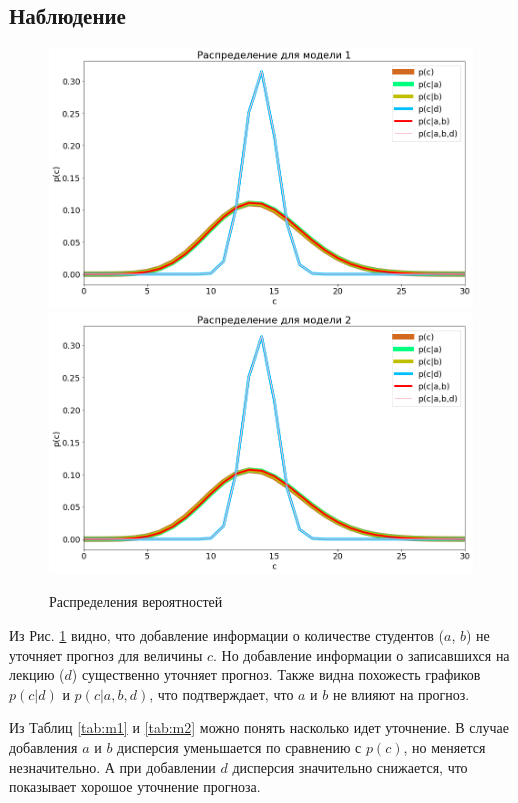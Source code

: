 \documentclass[12pt, a4paper]{article}
\begin{document}
        \subsection{Наблюдение}
            \begin{figure}
                \includegraphics[width=\linewidth]{model1}
                \includegraphics[width=\linewidth]{model2}
                \caption{Распределения вероятностей}
                \label{fig:m1}
            \end{figure}

            Из Рис. \ref{fig:m1} видно, что добавление информации о количестве студентов ($a$, $b$) не уточняет прогноз для величины $c$. Но добавление информации о записавшихся на лекцию ($d$) существенно уточняет прогноз. Также видна похожесть графиков $p(c|d)$ и $p(c|a,b,d)$, что подтверждает, что $a$ и $b$ не влияют на прогноз.

            Из Таблиц \ref{tab:m1} и \ref{tab:m2} можно понять насколько идет уточнение. В случае добавления $a$ и $b$ дисперсия уменьшается по сравнению с $p(c)$, но меняется незначительно. А при добавлении $d$ дисперсия значительно снижается, что показывает хорошое уточнение прогноза.
\end{document}
